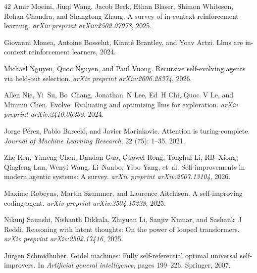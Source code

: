 \begin{thebibliography}{42}
Amir Moeini, Jiuqi Wang, Jacob Beck, Ethan Blaser, Shimon Whiteson, Rohan Chandra, and Shangtong Zhang.
\newblock A survey of in-context reinforcement learning.
\newblock \emph{arXiv preprint arXiv:2502.07978}, 2025.

Giovanni Monea, Antoine Bosselut, Kiant{\'e} Brantley, and Yoav Artzi.
\newblock Llms are in-context reinforcement learners, 2024.

Michael Nguyen, Quoc Nguyen, and Paul Vuong.
\newblock Recursive self-evolving agents via held-out selection.
\newblock \emph{arXiv preprint arXiv:2606.28374}, 2026.

Allen Nie, Yi~Su, Bo~Chang, Jonathan~N Lee, Ed~H Chi, Quoc~V Le, and Minmin Chen.
\newblock Evolve: Evaluating and optimizing llms for exploration.
\newblock \emph{arXiv preprint arXiv:2410.06238}, 2024.

Jorge P{\'e}rez, Pablo Barcel{\'o}, and Javier Marinkovic.
\newblock Attention is turing-complete.
\newblock \emph{Journal of Machine Learning Research}, 22 (75): 1--35, 2021.

Zhe Ren, Yimeng Chen, Dandan Guo, Guowei Rong, Tonghui Li, RB~Xiong, Qingfeng Lan, Wenyi Wang, Li~Nanbo, Yibo Yang, et~al.
\newblock Self-improvements in modern agentic systems: A survey.
\newblock \emph{arXiv preprint arXiv:2607.13104}, 2026.

Maxime Robeyns, Martin Szummer, and Laurence Aitchison.
\newblock A self-improving coding agent.
\newblock \emph{arXiv preprint arXiv:2504.15228}, 2025.

Nikunj Saunshi, Nishanth Dikkala, Zhiyuan Li, Sanjiv Kumar, and Sashank~J Reddi.
\newblock Reasoning with latent thoughts: On the power of looped transformers.
\newblock \emph{arXiv preprint arXiv:2502.17416}, 2025.

J{\"u}rgen Schmidhuber.
\newblock G{\"o}del machines: Fully self-referential optimal universal self-improvers.
\newblock In \emph{Artificial general intelligence}, pages 199--226. Springer, 2007.


\end{thebibliography}
